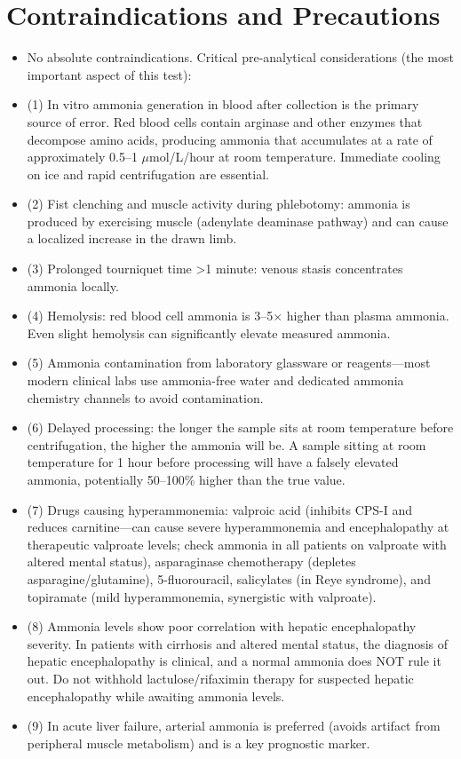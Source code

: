 \section*{Contraindications and Precautions}
\begin{itemize}
  \item No absolute contraindications. Critical pre-analytical considerations (the most important aspect of this test):
  \item (1) In vitro ammonia generation in blood after collection is the primary source of error. Red blood cells contain arginase and other enzymes that decompose amino acids, producing ammonia that accumulates at a rate of approximately 0.5--1 $\mu$mol/L/hour at room temperature. Immediate cooling on ice and rapid centrifugation are essential.
  \item (2) Fist clenching and muscle activity during phlebotomy: ammonia is produced by exercising muscle (adenylate deaminase pathway) and can cause a localized increase in the drawn limb.
  \item (3) Prolonged tourniquet time >1 minute: venous stasis concentrates ammonia locally.
  \item (4) Hemolysis: red blood cell ammonia is 3--5$\times$ higher than plasma ammonia. Even slight hemolysis can significantly elevate measured ammonia.
  \item (5) Ammonia contamination from laboratory glassware or reagents---most modern clinical labs use ammonia-free water and dedicated ammonia chemistry channels to avoid contamination.
  \item (6) Delayed processing: the longer the sample sits at room temperature before centrifugation, the higher the ammonia will be. A sample sitting at room temperature for 1 hour before processing will have a falsely elevated ammonia, potentially 50--100\% higher than the true value.
  \item (7) Drugs causing hyperammonemia: valproic acid (inhibits CPS-I and reduces carnitine---can cause severe hyperammonemia and encephalopathy at therapeutic valproate levels; check ammonia in all patients on valproate with altered mental status), asparaginase chemotherapy (depletes asparagine/glutamine), 5-fluorouracil, salicylates (in Reye syndrome), and topiramate (mild hyperammonemia, synergistic with valproate).
  \item (8) Ammonia levels show poor correlation with hepatic encephalopathy severity. In patients with cirrhosis and altered mental status, the diagnosis of hepatic encephalopathy is clinical, and a normal ammonia does NOT rule it out. Do not withhold lactulose/rifaximin therapy for suspected hepatic encephalopathy while awaiting ammonia levels.
  \item (9) In acute liver failure, arterial ammonia is preferred (avoids artifact from peripheral muscle metabolism) and is a key prognostic marker.
\end{itemize}

